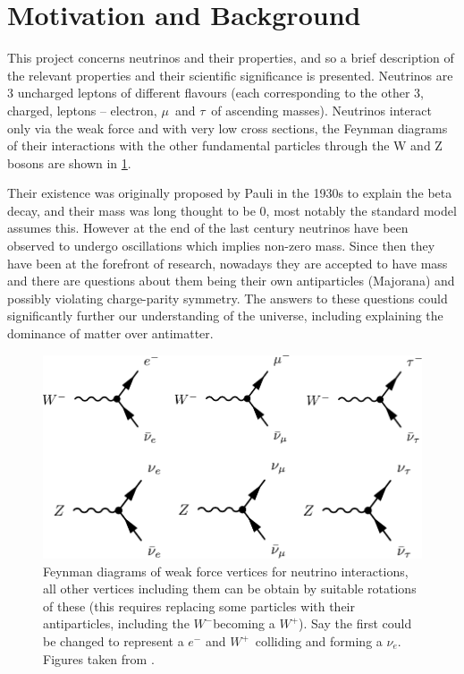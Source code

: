 \documentclass[a4paper,12pt]{article}
\newcommand{\Mu}{$\mu$}
\newcommand{\Tau}{$\tau$}
\newcommand{\Ne}{$\nu_e$}
\newcommand{\Wp}{$W^+$}
\newcommand{\Wm}{$W^-$}
\begin{document}
\pagestyle{plain}
\setcounter{page}{1}

\section{Motivation and Background}
This project concerns neutrinos and their properties, and so a brief description of the relevant properties and their scientific significance is presented.
Neutrinos are 3 uncharged leptons of different flavours (each corresponding to the other 3, charged, leptons -- electron, \Mu\ and \Tau\ of ascending masses).
Neutrinos interact only via the weak force and with very low cross sections, the Feynman diagrams of their interactions with the other fundamental particles through the W and Z bosons are shown in \cref{fig:nu_feyn}.

Their existence was originally proposed by Pauli in the 1930s to explain the beta decay, and their mass was long thought to be 0, most notably the standard model assumes this.
However at the end of the last century neutrinos have been observed to undergo oscillations which implies non-zero mass.
Since then they have been at the forefront of research, nowadays they are accepted to have mass and there are questions about them being their own antiparticles (Majorana) and possibly violating charge-parity symmetry.
The answers to these questions could significantly further our understanding of the universe, including explaining the dominance of matter over antimatter.

\begin{figure}[H]
    \centering
    \includegraphics{figures/NeutrinoFeynman.pdf}
    \caption{
        Feynman diagrams of weak force vertices for neutrino interactions, all other vertices including them can be obtain by suitable rotations of these
        (this requires replacing some particles with their antiparticles, including the \Wm becoming a \Wp).
        Say the first could be changed to represent a $e^-$ and \Wp\ colliding and forming a \Ne.
        Figures taken from \cite{potterFeynmanDiagramsParticlea}.
    }\label{fig:nu_feyn}
\end{figure}
\end{document}
